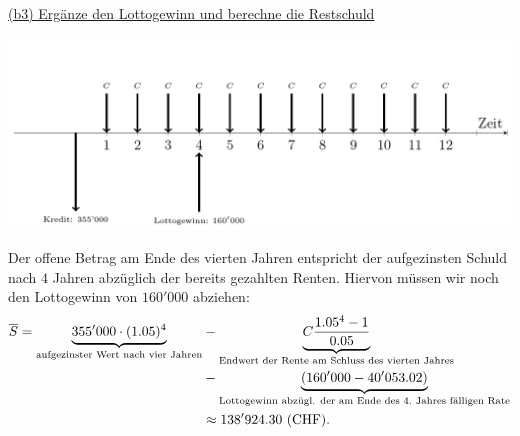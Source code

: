 \underline{(b3) Ergänze den Lottogewinn und berechne die Restschuld}\\
\begin{center}
	\includegraphics[scale=0.55]{pictures/zeitstrahl_1_b_filled_2}
\end{center}
Der offene Betrag am Ende  des vierten Jahren entspricht der aufgezinsten Schuld nach $ 4 $ Jahren abzüglich der bereits gezahlten Renten.
Hiervon müssen wir noch den Lottogewinn von $ 160'000 $ abziehen:
\begin{align*}
	\overline{S}
	=
	\underbrace{355'000 \cdot (1.05)^{4}}_{\textrm{aufgezinster Wert nach vier Jahren} }
	&-
	\underbrace{C\frac{1.05^4 - 1}{0.05}}_{\textrm{Endwert der Rente am Schluss des vierten Jahres}}\\
	&-\underbrace{(160'000 -40'053.02 ) }_{\textrm{Lottogewinn abzügl. der am Ende des $ 4. $ Jahres fälligen Rate}}\\
	&\approx 
	138'924.30 \ \mathrm{(CHF)}.
\end{align*}

